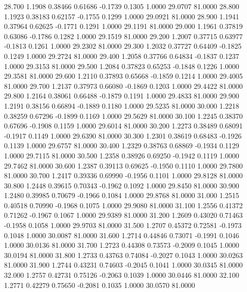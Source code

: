   28.700   1.1908   0.38466   0.61686  -0.1739   0.1305   1.0000  29.0707  81.0000
  28.800   1.1923   0.38183   0.62157  -0.1755   0.1299   1.0000  29.0921  81.0000
  28.900   1.1941   0.37964   0.62625  -0.1771   0.1291   1.0000  29.1191  81.0000
  29.000   1.1961   0.37819   0.63086  -0.1786   0.1282   1.0000  29.1519  81.0000
  29.200   1.2007   0.37715   0.63977  -0.1813   0.1261   1.0000  29.2302  81.0000
  29.300   1.2032   0.37727   0.64409  -0.1825   0.1249   1.0000  29.2724  81.0000
  29.400   1.2058   0.37766   0.64834  -0.1837   0.1237   1.0000  29.3153  81.0000
  29.500   1.2084   0.37823   0.65253  -0.1848   0.1226   1.0000  29.3581  81.0000
  29.600   1.2110   0.37893   0.65668  -0.1859   0.1214   1.0000  29.4005  81.0000
  29.700   1.2137   0.37973   0.66080  -0.1869   0.1203   1.0000  29.4422  81.0000
  29.800   1.2164   0.38061   0.66488  -0.1879   0.1191   1.0000  29.4833  81.0000
  29.900   1.2191   0.38156   0.66894  -0.1889   0.1180   1.0000  29.5235  81.0000
  30.000   1.2218   0.38259   0.67296  -0.1899   0.1169   1.0000  29.5629  81.0000
  30.100   1.2245   0.38370   0.67696  -0.1908   0.1159   1.0000  29.6014  81.0000
  30.200   1.2273   0.38489   0.68091  -0.1917   0.1149   1.0000  29.6390  81.0000
  30.300   1.2301   0.38619   0.68483  -0.1926   0.1139   1.0000  29.6757  81.0000
  30.400   1.2329   0.38763   0.68869  -0.1934   0.1129   1.0000  29.7115  81.0000
  30.500   1.2358   0.38926   0.69250  -0.1942   0.1119   1.0000  29.7462  81.0000
  30.600   1.2387   0.39113   0.69625  -0.1950   0.1110   1.0000  29.7800  81.0000
  30.700   1.2417   0.39336   0.69990  -0.1956   0.1101   1.0000  29.8128  81.0000
  30.800   1.2448   0.39615   0.70343  -0.1962   0.1092   1.0000  29.8450  81.0000
  30.900   1.2480   0.39985   0.70679  -0.1966   0.1084   1.0000  29.8768  81.0000
  31.000   1.2515   0.40518   0.70990  -0.1968   0.1075   1.0000  29.9080  81.0000
  31.100   1.2556   0.41372   0.71262  -0.1967   0.1067   1.0000  29.9389  81.0000
  31.200   1.2609   0.43020   0.71463  -0.1958   0.1058   1.0000  29.9703  81.0000
  31.500   1.2707   0.45372   0.72581  -0.1973   0.1048   1.0000  30.0087  81.0000
  31.600   1.2714   0.44846   0.73071  -0.1991   0.1046   1.0000  30.0136  81.0000
  31.700   1.2723   0.44308   0.73573  -0.2009   0.1045   1.0000  30.0194  81.0000
  31.800   1.2733   0.43763   0.74084  -0.2027   0.1043   1.0000  30.0263  81.0000
  31.900   1.2744   0.43231   0.74603  -0.2045   0.1041   1.0000  30.0345  81.0000
  32.000   1.2757   0.42731   0.75126  -0.2063   0.1039   1.0000  30.0446  81.0000
  32.100   1.2771   0.42279   0.75650  -0.2081   0.1035   1.0000  30.0570  81.0000
